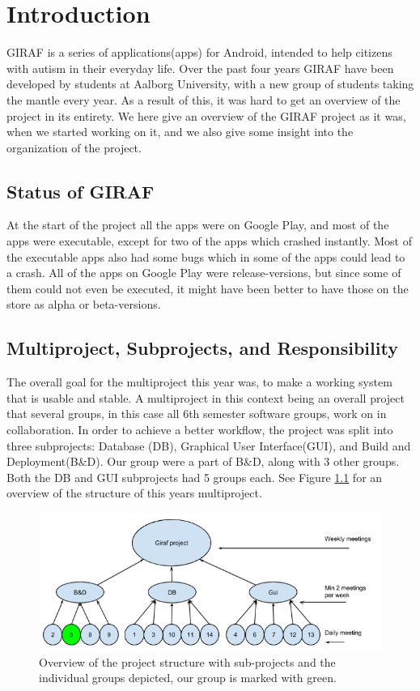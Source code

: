 \chapter{Introduction} \label{ChapIntroduction}
GIRAF is a series of applications(apps) for Android, intended to help citizens with autism in their everyday life. Over the past four years GIRAF have been developed by students at Aalborg University, with a new group of students taking the mantle every year. As a result of this, it was hard to get an overview of the project in its entirety. We here give an overview of the GIRAF project as it was, when we started working on it, and we also give some insight into the organization of the project.

\section{Status of GIRAF} %
At the start of the project all the apps were on Google Play, and most of the apps were executable, except for two of the apps which crashed instantly. Most of the executable apps also had some bugs which in some of the apps could lead to a crash. All of the apps on Google Play were release-versions, but since some of them could not even be executed, it might have been better to have those on the store as alpha or beta-versions.

\section{Multiproject, Subprojects, and Responsibility} %
The overall goal for the multiproject this year was, to make a working system that is usable and stable. A multiproject in this context being an overall project that several groups, in this case all 6th semester software groups, work on in collaboration. In order to achieve a better workflow, the project was split into three subprojects: Database (DB), Graphical User Interface(GUI), and Build and Deployment(B\&D). Our group were a part of B\&D, along with 3 other groups. Both the DB and GUI subprojects had 5 groups each. See Figure \ref{ScrumOfScrumsOverview} for an overview of the structure of this years multiproject.

\begin{figure}
	\centering
	\includegraphics[width=0.8 \textwidth]{pictures/ScrumOfScrum.png}
	\caption{Overview of the project structure with sub-projects and the individual groups depicted, our group is marked with green.}
	\label{ScrumOfScrumsOverview}
\end{figure}

